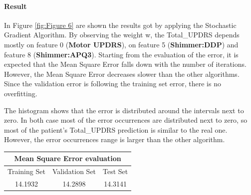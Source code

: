 \documentclass[12pt,a4paper,oneside]{article}
\begin{document}
	\paragraph{Result} In Figure \ref{fig:Figure 6} are shown the results got by applying the Stochastic Gradient Algorithm. By observing the weight w, the Total\_UPDRS depends mostly on feature 0 (\textbf{Motor UPDRS}), on feature 5 (\textbf{Shimmer:DDP}) and feature 8 (\textbf{Shimmer:APQ3}). Starting from the evaluation of the error, it is expected that the Mean Square Error falls down with the number of iterations. However, the Mean Square Error decreases slower than the other algorithms. Since the validation error is following the training set error, there is no overfitting.
	
	The histogram shows that the error is distributed around the intervals next to zero. In both case most of the error occurrences are distributed next to zero, so most of the patient's Total\_UPDRS prediction is similar to the real one. However, the error occurrences range is larger than the other algorithm.
	
	\begin{center}
		\begin{tabular}{ccc}	
			\toprule 
			\multicolumn{3}{c}{\textbf{Mean Square Error evaluation}} \\ 
			\midrule 
			Training Set & Validation Set & Test Set \\ 
			\midrule 
			14.1932 & 14.2898 & 14.3141 \\ 
			\bottomrule 
		\end{tabular} 
	\end{center}
	
\end{document}
